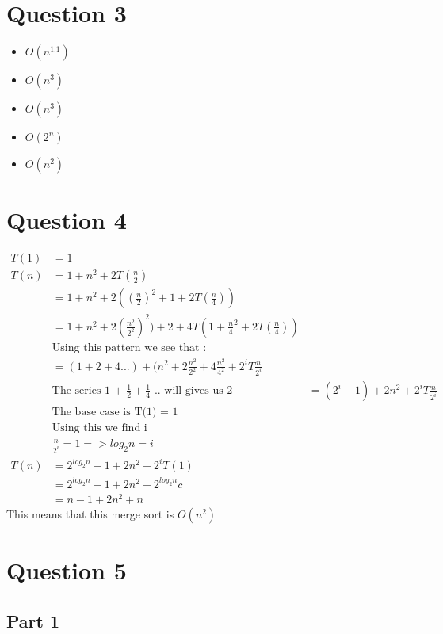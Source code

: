 \documentclass{article}
\begin{document}
\section{Question 3}

    \begin{itemize}
        \item $O(n^1.1)$
        \item $O(n^3)$
        \item $O(n^3)$
        \item $O(2^n)$
        \item $O(n^2)$
    \end{itemize}

\section{Question 4}

    \begin{align*}
        T(1) &= 1 \\
        T(n) &= 1 + n^2 + 2T(\frac{n}{2}) \\
        &= 1 + n^2 + 2((\frac{n}{2})^2 + 1 + 2T(\frac{n}{4}))\\
        &= 1 + n^2 + 2(\frac{n^2}{2^2})^2) + 2 + 4T(1 + \frac{n}{4}^2 + 2T(\frac{n}{4}))\\
        &\textrm{Using this pattern we see that :}\\
        &= (1 + 2 + 4 ... ) + (n^2 + 2\frac{n^2}{2^2} + 4\frac{n^2}{4^2} + 2^i T\frac{n}{2^i}\\
        &\textrm{The series 1 + $\frac{1}{2} + \frac{1}{4}$ .. will gives us 2}
        &= (2^i -1) + 2n^2 + 2^i T\frac{n}{2^i}\\
        &\textrm{The base case is T(1) = 1}\\
        &\textrm{Using this we find i}\\
        &\frac{n}{2^i} = 1 => log_2 n = i\\
        T(n) &= 2^{log_2 n} - 1 + 2n^2 + 2^i T(1)\\
        &= 2^{log_2 n} - 1 + 2n^2 + 2^{log_2 n} c\\
        &= n - 1 + 2n^2 + n
    \end{align*}
    This means that this merge sort is $O(n^2)$

\section{Question 5}
    \subsection{Part 1}
\end{document}
